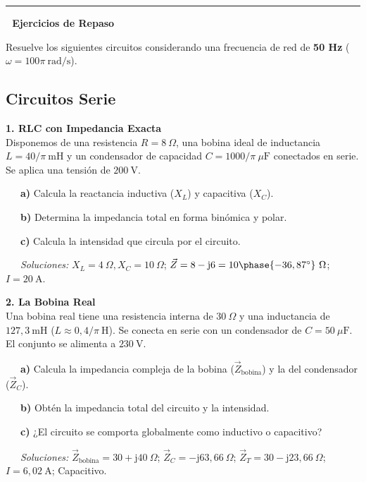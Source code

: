 \documentclass[
  a4paper,
  DIV=11,
  numbers=noendperiod]{scrreprt}
\begin{document}
\begin{center}\rule{0.5\linewidth}{0.5pt}\end{center}

\begin{tcolorbox}[enhanced jigsaw, breakable, colback=white, left=2mm, leftrule=.75mm, rightrule=.15mm, toprule=.15mm, colframe=quarto-callout-important-color-frame, arc=.35mm, bottomrule=.15mm, opacityback=0]

\vspace{-3mm}\textbf{📝 Ejercicios de Repaso}\vspace{3mm}

Resuelve los siguientes circuitos considerando una frecuencia de red de
\textbf{50 Hz} (\(\omega = 100\pi \ \text{rad/s}\)).

\subsection*{Circuitos Serie}\label{circuitos-serie}

\textbf{1. RLC con Impedancia Exacta}\\
Disponemos de una resistencia \(R=8 \ \Omega\), una bobina ideal de
inductancia \(L=40/\pi \ \text{mH}\) y un condensador de capacidad
\(C=1000/\pi \ \mu\text{F}\) conectados en serie. Se aplica una tensión
de \(200 \ \text{V}\).\\
\strut ~~~\textbf{a)} Calcula la reactancia inductiva (\(X_L\)) y
capacitiva (\(X_C\)).\\
\strut ~~~\textbf{b)} Determina la impedancia total en forma binómica y
polar.\\
\strut ~~~\textbf{c)} Calcula la intensidad que circula por el
circuito.\\
\strut ~~~\emph{Soluciones:} \(X_L=4 \ \Omega, X_C=10 \ \Omega\);
\(\vec{Z}=8-\mathrm{j}6 = 10 \phase{-36,87^\circ} \ \Omega\);
\(I=20 \ \text{A}\).

\textbf{2. La Bobina Real}\\
Una bobina real tiene una resistencia interna de \(30 \ \Omega\) y una
inductancia de \(127,3 \ \text{mH}\) (\(L \approx 0,4/\pi \ \text{H}\)).
Se conecta en serie con un condensador de \(C=50 \ \mu\text{F}\). El
conjunto se alimenta a \(230 \ \text{V}\).\\
\strut ~~~\textbf{a)} Calcula la impedancia compleja de la bobina
(\(\vec{Z}_{\text{bobina}}\)) y la del condensador (\(\vec{Z}_C\)).\\
\strut ~~~\textbf{b)} Obtén la impedancia total del circuito y la
intensidad.\\
\strut ~~~\textbf{c)} ¿El circuito se comporta globalmente como
inductivo o capacitivo?\\
\strut ~~~\emph{Soluciones:}
\(\vec{Z}_{\text{bobina}}=30+\mathrm{j}40 \ \Omega\);
\(\vec{Z}_C=-\mathrm{j}63,66 \ \Omega\);
\(\vec{Z}_T=30-\mathrm{j}23,66 \ \Omega\); \(I=6,02 \ \text{A}\);
Capacitivo.


\end{tcolorbox}
\end{document}
